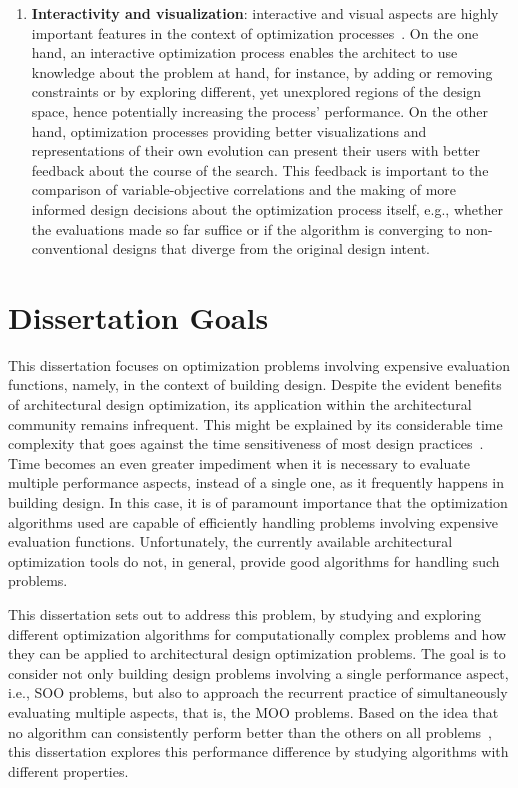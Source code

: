 \begin{enumerate}
\item \textbf{Interactivity and visualization}: interactive and visual aspects are highly important features in the context of optimization processes~\cite{Ashour2015CreativelyMOO}. On the one hand, an interactive optimization process enables the architect to use knowledge about the problem at hand, for instance, by adding or removing constraints or by exploring different, yet unexplored regions of the design space, hence potentially increasing the process' performance. On the other hand, optimization processes providing better visualizations and representations of their own evolution can present their users with better feedback about the course of the search. This feedback is important to the comparison of variable-objective correlations and the making of more informed design decisions about the optimization process itself, e.g., whether the evaluations made so far suffice or if the algorithm is converging to non-conventional designs that diverge from the original design intent.
\end{enumerate}

\section{Dissertation Goals}
\label{sec:goals}

This dissertation focuses on optimization problems involving expensive evaluation functions, namely, in the context of building design. Despite the evident benefits of architectural design optimization, its application within the architectural community remains infrequent. This might be explained by its considerable time complexity that goes against the time sensitiveness of most design practices~\cite{Shi2016}. Time becomes an even greater impediment when it is necessary to evaluate multiple performance aspects, instead of a single one, as it frequently happens in building design. In this case, it is of paramount importance that the optimization algorithms used are capable of efficiently handling problems involving expensive evaluation functions. Unfortunately, the currently available architectural optimization tools do not, in general, provide good algorithms for handling such problems.

This dissertation sets out to address this problem, by studying and exploring different optimization algorithms for computationally complex problems and how they can be applied to architectural design optimization problems. The goal is to consider not only building design problems involving a single performance aspect, i.e., \ac{SOO} problems, but also to approach the recurrent practice of simultaneously evaluating multiple aspects, that is, the \ac{MOO} problems. Based on the idea that no algorithm can consistently perform better than the others on all problems~\cite{Wolpert1997NFLT}, this dissertation explores this performance difference by studying algorithms with different properties. 

